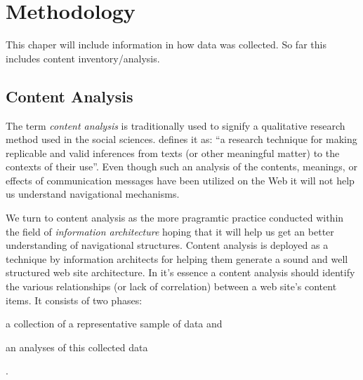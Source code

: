 \chapter{Methodology}
\label{chapter:methodology}

This chaper will include information in how data was collected. So far this
includes content inventory/analysis.

\section{Content Analysis}

The term \emph{content analysis} is traditionally used to signify a
qualitative research method used in the social sciences.
\citet[p.~18]{krippendorff03} defines it as:
``a research technique for making replicable and valid
inferences from texts (or other meaningful matter) to the contexts of their
use''. Even though such an analysis of the contents, meanings, or effects of
communication messages have been utilized on the Web \citep{weare00} it will
not help us understand navigational mechanisms.

We turn to content analysis as the more pragramtic practice conducted within
the field of \emph{information architecture}%
 hoping that it will help us get an better understanding of navigational
structures.
Content analysis is deployed as a technique by information architects for
helping them generate a sound and well structured web site architecture.
In it's essence a content analysis should identify the various
relationships (or lack of correlation) between a web site's content items.
It consists of two phases:
\begin{inparaenum}[(i)]
  \item a collection of a representative sample of data and
  \item an analyses of this collected data
\end{inparaenum}
\citep[pp.~241--243]{morville06}.

